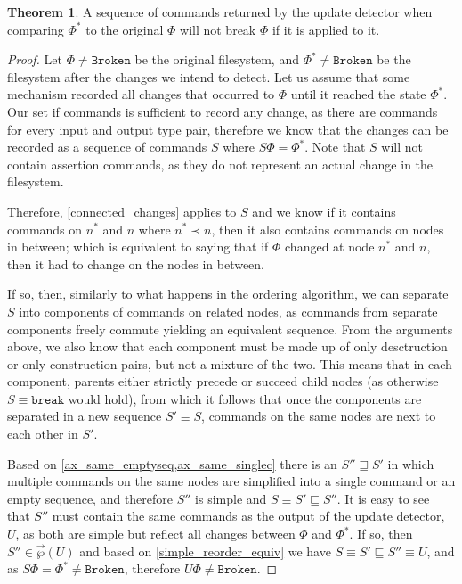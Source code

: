 \documentclass[12pt]{article}
\newcommand{\fsbroken}{\mathtt{Broken}} %
\newcommand{\FS}{\Phi} %
\newcommand{\nn}{n^*} %
\newcommand{\cbrk}{\mathtt{break}} %
\newcommand{\descendant}{\prec}
\newcommand{\eqext}{\sqsubseteq} %
\newcommand{\eqnrw}{\sqsupseteq} %
\newcommand{\orderset}[1]{\vec{\wp}({#1})}
\theoremstyle{definition}
\newtheorem{myth}{Theorem}
\begin{document}
\begin{myth}\label{update_works}
A sequence of commands returned by the update detector
when comparing $\FS^*$ to the original $\FS$
will not break $\FS$ if it is applied to it.
\end{myth}
\begin{proof}
Let $\FS\neq\fsbroken$ be the original filesystem, and $\FS^*\neq\fsbroken$
be the filesystem after the changes we intend to detect.
Let us assume that some mechanism recorded all changes that occurred
to $\FS$ until it reached the state $\FS^*$.
Our set if commands is sufficient to record any change, as
there are commands for every input and output type pair, therefore
we know that the changes can be recorded as a sequence of commands $S$
where $S\FS=\FS^*$.
Note that $S$ will not contain assertion commands, as they do not
represent an actual change in the filesystem.

Therefore, \cref{connected_changes} applies to $S$ and we know
if it contains commands on $\nn$ and $n$ where $\nn\descendant n$,
then it also contains commands on nodes in between;
which is equivalent to saying that if $\FS$ changed
at node $\nn$ and $n$, then it had to change on the nodes in between.

If so, then, similarly to what happens in the ordering algorithm,
we can separate $S$ into components of commands on related nodes,
as commands from separate components freely commute yielding an equivalent sequence.
From the arguments above, we also know that each component
must be made up of only desctruction or only construction pairs,
but not a mixture of the two.
This means that in each component, parents either strictly precede or succeed child nodes
(as otherwise $S\equiv\cbrk$ would hold),
from which it follows that once the components are separated
in a new sequence $S'\equiv S$,
commands on the same nodes are next to each other in $S'$.

Based on \cref{ax_same_emptyseq,ax_same_singlec} there is
an $S''\eqnrw S'$ in which multiple commands on the same nodes
are simplified into a single command or an empty sequence,
and therefore $S''$ is simple and $S\equiv S'\eqext S''$.
It is easy to see that $S''$ must contain the same commands
as the output of the update detector, $U$, as both are simple
but reflect all changes between $\FS$ and $\FS^*$.
If so, then $S''\in\orderset{U}$ and based on \cref{simple_reorder_equiv}
we have
$S\equiv S'\eqext S''\equiv U$, and as $S\FS = \FS^* \neq \fsbroken$,
therefore $U\FS\neq\fsbroken$.
\end{proof}
\end{document}
